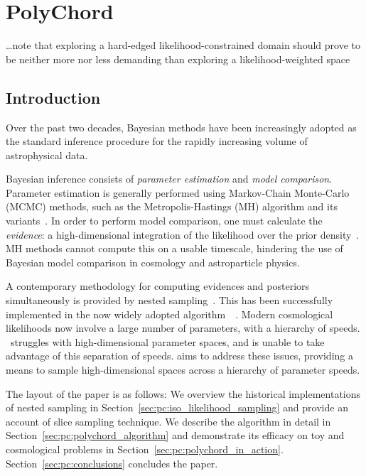 \chapter{PolyChord}
\label{chap:pc}

\epigraph{\ldots note that exploring a hard-edged likelihood-constrained domain should prove to be neither more nor less demanding than exploring a likelihood-weighted space }{\johnskilling{}}

\section{Introduction}
\label{sec:pc:introduction}
Over the past two decades, Bayesian methods have been increasingly adopted as the standard inference procedure for the rapidly increasing volume of astrophysical data.

Bayesian inference consists of {\em parameter estimation\/} and {\em model comparison}.  Parameter estimation is generally performed using Markov-Chain Monte-Carlo (MCMC) methods, such as the Metropolis-Hastings (MH) algorithm and its variants~\citep{Mackay}.  In order to perform model comparison, one must calculate the {\em evidence\/}: a high-dimensional integration of the likelihood over the prior density~\citep{Sivia}.  MH methods cannot compute this on a usable timescale, hindering the use of Bayesian model comparison in cosmology and astroparticle physics.

A contemporary methodology for computing evidences and posteriors simultaneously is provided by nested sampling~\citep{skilling2006}. This has been successfully implemented in the now widely adopted algorithm \MultiNest\,~\citep{MultiNest1,MultiNest2,MultiNest3}.  Modern cosmological likelihoods now involve a large number of parameters, with a hierarchy of speeds.  \MultiNest\ struggles with high-dimensional parameter spaces, and is unable to take advantage of this separation of speeds.  \PolyChord{} aims to address these issues, providing a means to sample high-dimensional spaces across a hierarchy of parameter speeds.

The layout of the paper is as follows:
We overview the historical implementations of nested sampling in Section~\ref{sec:pc:iso_likelihood_sampling} and provide an account of  slice sampling technique.
We describe the \PolyChord{} algorithm in detail in Section~\ref{sec:pc:polychord_algorithm} and demonstrate its efficacy on toy and cosmological problems in Section~\ref{sec:pc:polychord_in_action}.  
Section~\ref{sec:pc:conclusions} concludes the paper.

